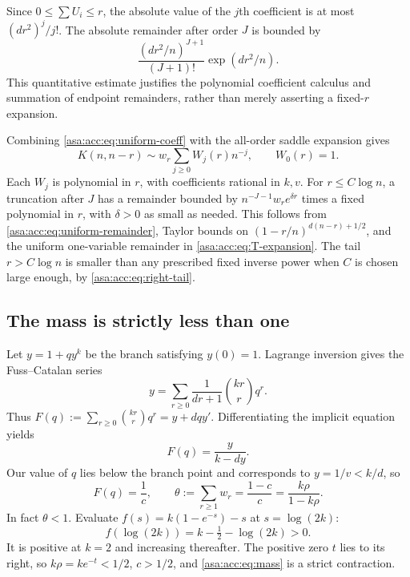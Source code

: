 \documentclass[11pt,letterpaper]{article}
\theoremstyle{remark}\newtheorem{remark}[theorem]{Remark}
\numberwithin{equation}{section}
\begin{document}
Since $0\le\sum U_i\le r$, the absolute value of the $j$th coefficient is at most $(dr^2)^j/j!$. The absolute remainder after order $J$ is bounded by
\begin{equation}\label{asa:acc:eq:uniform-remainder}
\frac{(dr^2/n)^{J+1}}{(J+1)!}\exp(dr^2/n).
\end{equation}
This quantitative estimate justifies the polynomial coefficient calculus and summation of endpoint remainders, rather than merely asserting a fixed-$r$ expansion.

Combining \eqref{asa:acc:eq:uniform-coeff} with the all-order saddle expansion gives
\begin{equation}\label{asa:acc:eq:W}
K(n,n-r)\sim w_r\sum_{j\ge0}W_j(r)n^{-j},\qquad W_0(r)=1.
\end{equation}
Each $W_j$ is polynomial in $r$, with coefficients rational in $k,v$. For $r\le C\log n$, a truncation after $J$ has a remainder bounded by $n^{-J-1}w_re^{\delta r}$ times a fixed polynomial in $r$, with $\delta>0$ as small as needed. This follows from \eqref{asa:acc:eq:uniform-remainder}, Taylor bounds on $(1-r/n)^{d(n-r)+1/2}$, and the uniform one-variable remainder in \eqref{asa:acc:eq:T-expansion}. The tail $r>C\log n$ is smaller than any prescribed fixed inverse power when $C$ is chosen large enough, by \eqref{asa:acc:eq:right-tail}.

\subsection{The mass is strictly less than one}\label{asa:acc:sec:mass}
Let $y=1+qy^k$ be the branch satisfying $y(0)=1$. Lagrange inversion gives the Fuss--Catalan series
\[
y=\sum_{r\ge0}\frac1{dr+1}\binom{kr}{r}q^r.
\]
Thus $F(q):=\sum_{r\ge0}\binom{kr}{r}q^r=y+dqy'$. Differentiating the implicit equation yields
\[
F(q)=\frac{y}{k-dy}.
\]
Our value of $q$ lies below the branch point and corresponds to $y=1/v<k/d$, so
\begin{equation}\label{asa:acc:eq:mass}
F(q)=\frac1c,\qquad
\theta:=\sum_{r\ge1}w_r=\frac{1-c}{c}=\frac{k\rho}{1-k\rho}.
\end{equation}
In fact $\theta<1$. Evaluate $f(s)=k(1-e^{-s})-s$ at $s=\log(2k)$:
\[
f(\log(2k))=k-\tfrac12-\log(2k)>0.
\]
It is positive at $k=2$ and increasing thereafter. The positive zero $t$ lies to its right, so $k\rho=ke^{-t}<1/2$, $c>1/2$, and \eqref{asa:acc:eq:mass} is a strict contraction.
\end{document}
